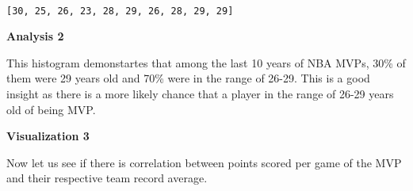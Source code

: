 \documentclass[11pt]{article}
\begin{document}
    \begin{center}
    \end{center}
    { \hspace*{\fill} \\}
    
    \begin{Verbatim}[commandchars=\\\{\}]
[30, 25, 26, 23, 28, 29, 26, 28, 29, 29]

    \end{Verbatim}

    \textbf{Analysis 2}

This histogram demonstartes that among the last 10 years of NBA MVPs,
30\% of them were 29 years old and 70\% were in the range of 26-29. This
is a good insight as there is a more likely chance that a player in the
range of 26-29 years old of being MVP.

\textbf{Visualization 3}

Now let us see if there is correlation between points scored per game of
the MVP and their respective team record average.
\end{document}
